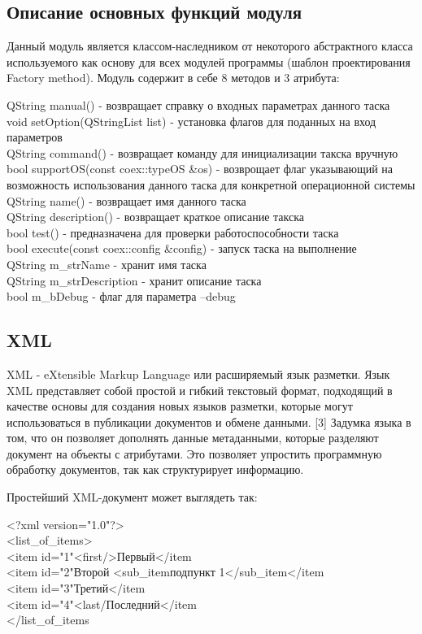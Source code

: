 \subsection{Описание основных функций модуля}

Данный модуль является классом-наследником от некоторого абстрактного класса используемого как основу для всех модулей программы (шаблон проектирования Factory method). Модуль содержит в себе 8 методов и 3 атрибута: 

QString manual() - возвращает справку о входных параметрах данного таска \\
void setOption(QStringList list) - установка флагов для поданных на вход параметров \\
QString command() - возвращает команду для инициализации такска вручную \\
bool supportOS(const coex::typeOS &os) - возврощает флаг указывающий на возможность использования данного таска для конкретной операционной системы \\
QString name() - возвращает имя данного таска \\
QString description() - возвращает краткое описание такска \\
bool test() - предназначена для проверки работоспособности таска \\
bool execute(const coex::config &config) - запуск таска на выполнение \\
QString m_strName - хранит имя таска \\
QString m_strDescription - хранит описание таска \\
bool m_bDebug - флаг для параметра –debug 

\subsection{XML}

XML - eXtensible Markup Language или расширяемый язык разметки. Язык XML представляет собой простой и гибкий текстовый формат, подходящий в качестве основы для создания новых языков разметки, которые могут использоваться в публикации документов и обмене данными. [3] Задумка языка в том, что он позволяет дополнять данные метаданными, которые разделяют документ на объекты с атрибутами. Это позволяет упростить программную обработку документов, так как структурирует информацию. 

Простейший XML-документ может выглядеть так: 

<?xml version="1.0"?> \\
<list_of_items> \\
<item id="1"\><first/>Первый</item\> \\
<item id="2"\>Второй <sub_item\>подпункт 1</sub_item\></item\> \\
<item id="3"\>Третий</item\> \\
<item id="4"\><last/\>Последний</item\> \\
</list_of_items\> 

